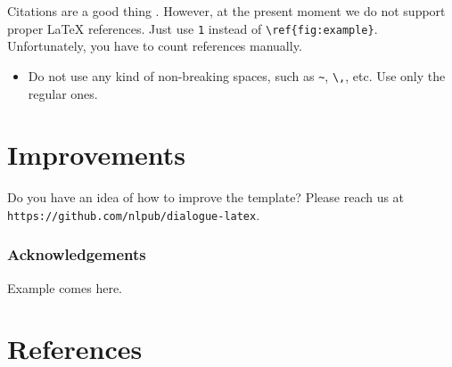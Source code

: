 \documentclass{dialogue}
\begin{document}
Citations are a good thing \cite{Panchenko:18,Sharoff:11}. However, at the present moment we do not support proper {\LaTeX} references. Just use \verb|1| instead of \verb|\ref{fig:example}|. Unfortunately, you have to count references manually.

\begin{itemize}
  \item Do not use any kind of non-breaking spaces, such as \verb|~|, \verb|\,|, etc. Use only the regular ones.
\end{itemize}

\section{Improvements}

Do you have an idea of how to improve the template? Please reach us at\\\texttt{https://github.com/nlpub/dialogue-latex}.

\subsubsection*{Acknowledgements}

Example comes here.

\color{blue}\section*{References}

\makeatletter
\renewcommand{\section}{\@gobbletwo}
\makeatother

\end{document}
